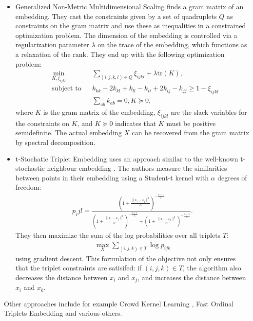 \begin{itemize}
    \item Generalized Non-Metric Multidimensional Scaling \citep[GNDMS,][]{agarwalGeneralizedNonmetricMultidimensional2007} finds a gram matrix of an embedding. They cast
        the constraints given by a set of quadruplets $Q$ as constraints on the gram matrix 
        and use these as inequalities in a constrained optimization problem. The dimension
        of the embedding is controlled via a regularization parameter $\lambda$ on
        the trace of the embedding, which functions as a relaxation of the rank. 
        They end up with the following optimization problem:
        \begin{align*}
            &\min_{K, \xi_{ijkl}}          &       & \sum_{(i,j,k,l) \in Q} \xi_{ijkl} + \lambda 
            \text{tr}(K),\\
            &\text{subject to} &       & k_{kk} - 2k_{kl} + k_{ll} - k_{ii} + 2k_{ij} - k_{jj}
            \ge 1 - \xi_{ijkl}\\
            &                  &       & \sum_{ab} k_{ab} = 0, K \succeq 0,
        \end{align*}
        where $K$ is the gram matrix of the embedding, $\xi_{ijkl}$ are the slack variables
        for the constraints on $K$, and $K \succeq 0$ indicates that $K$ must be
        positive semidefinite. The actual embedding $X$ can be recovered from the gram matrix by
        spectral decomposition. 
    \item t-Stochatic Triplet Embedding \citep[t-STE,][]{laurensvandermaatenStochasticTripletEmbedding2012} uses an approach similar to the well-known t-stochastic neighbour embedding 
        \citep[t-SNE,][]{maatenVisualizingDataUsing2008}. 
        The authors measure the similarities between points in their embedding using a Student-t kernel 
        with $\alpha$ degrees of freedom: 
        \begin{align*}
            p_ijl = \frac
            { \left( 1+ \frac{  \|x_i - x_j\|^2 }{\alpha}  \right)^{- \frac{\alpha + 1}{2}}  
            }
            { \left( 1+ \frac{  \|x_i - x_j\|^2 }{\alpha}  \right)^{- \frac{\alpha + 1}{2}} +
              \left( 1+ \frac{  \|x_i - x_k\|^2 }{\alpha}  \right)^{- \frac{\alpha + 1}{2}}  
            }
        .\end{align*}
        They then maximize the sum of the log probabilities over all triplets $T$:
        \begin{align*}
            \max_{X} \sum_{(i,j,k) \in T} \log p_{ijk}
        \end{align*}
        using gradient descent.
        This formulation of the objective not only ensures that the 
        triplet constraints are satisifed: if $(i,j,k) \in T$, the algorithm 
        also decreases the distance between $x_i$ and $x_j$, and increases the distance
        between $x_i$ and $x_k$. 
\end{itemize}
Other approaches include for example 
Crowd Kernel Learning \citep[CKL,][]{tamuzAdaptivelyLearningCrowd2011}, Fast Ordinal Triplets Embedding \citep[FORTE,][]{jainFiniteSamplePrediction2016} and various others. 

